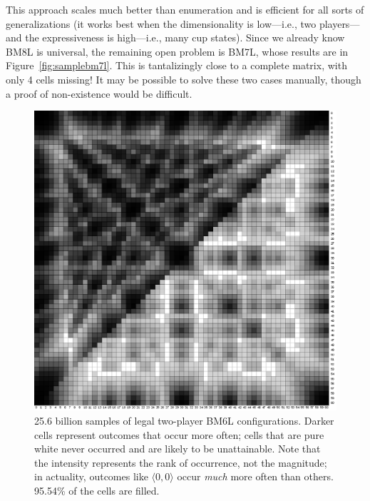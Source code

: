 \documentclass[twocolumn]{article}
\begin{document}
This approach scales much better than enumeration and is efficient for
all sorts of generalizations (it works best when the dimensionality is
low---i.e., two players---and the expressiveness is high---i.e., many
cup states). Since we already know BM8L is universal, the remaining
open problem is BM7L, whose results are in
Figure~\ref{fig:samplebm7l}. This is tantalizingly close to a complete
matrix, with only 4 cells missing! It may be possible to solve these
two cases manually, though a proof of non-existence would be
difficult.

\begin{figure}
\begin{center}
\includegraphics[width=0.90 \linewidth]{sample60min2players6states.png}
\end{center}\vspace{-0.1in}
\caption{ 25.6 billion samples of legal two-player BM6L
  configurations. Darker cells represent outcomes that occur more
  often; cells that are pure white never occurred and are likely to be
  unattainable. Note that the intensity represents the rank of
  occurrence, not the magnitude; in actuality, outcomes like $\langle
  0, 0 \rangle$ occur {\em much} more often than others.
  95.54\% of the cells are filled.
}
\label{fig:samplebm6l}
\end{figure}
\end{document}
